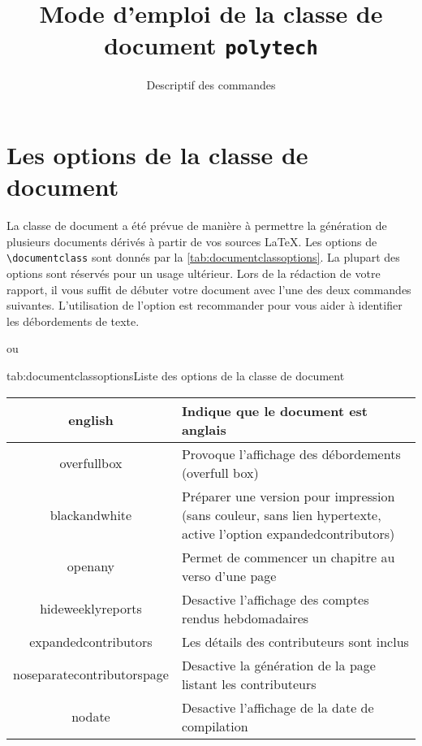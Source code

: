 \documentclass[overfullbox,hideweeklyreports,noseparatecontributorspage,nodate]{polytech}
\title{Mode d'emploi de la classe de document \texttt{polytech}}
\subtitle{Descriptif des commandes}
\begin{document}
\maketitle

\chapter{Les options de la classe de document}

La classe de document a été prévue de manière à permettre la génération de plusieurs documents dérivés à partir de vos sources LaTeX. Les options de \texttt{\textbackslash{}documentclass} sont donnés par la \autoref{tab:documentclassoptions}. La plupart des options sont réservés pour un usage ultérieur. Lors de la rédaction de votre rapport, il vous suffit de débuter votre document avec l'une des deux commandes suivantes. L'utilisation de l'option  est recommander pour vous aider à identifier les débordements de texte.
ou

\begin{Table}{tab:documentclassoptions}{Liste des options de la classe de document}
\begin{tabu}{|c|X[m]|}
\hline
english&Indique que le document est anglais\\\hline
overfullbox&Provoque l'affichage des débordements (overfull box)\\\hline
blackandwhite&Préparer une version pour impression (sans couleur, sans lien hypertexte, active l'option expandedcontributors)\\\hline
openany&Permet de commencer un chapitre au verso d'une page\\\hline
hideweeklyreports&Desactive l'affichage des comptes rendus hebdomadaires\\\hline
expandedcontributors&Les détails des contributeurs sont inclus\\\hline
noseparatecontributorspage&Desactive la génération de la page listant les contributeurs\\\hline
nodate&Desactive l'affichage de la date de compilation\\\hline
\end{tabu}
\end{Table}
\end{document}
